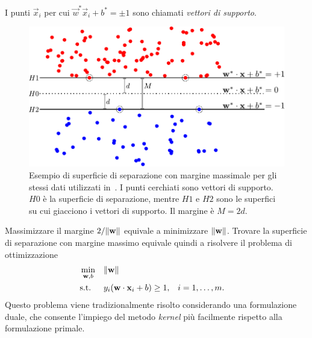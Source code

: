I punti $\Vec{x}_i$ per cui $\Vec{w}^*\Vec{x}_i + b^* = \pm 1$ sono chiamati \emph{vettori di supporto}.
\begin{figure}
    \centering
    \includegraphics[width=0.7\linewidth]{img/margine_separazione.pdf}
    \caption[Esempio \emph{maximal margin classifier}.]{Esempio di superficie di separazione con margine massimale per gli stessi dati utilizzati in~. I punti cerchiati sono vettori di supporto. $H0$ è la superficie di separazione, mentre $H1$ e $H2$ sono le superfici su cui giacciono i vettori di supporto. Il margine è $M=2d$.}
    \label{fig:optimal_separation_margin}
\end{figure}
%
Massimizzare il margine $2/\norm{\vec{w}}$ equivale a minimizzare $\norm{\Vec{w}}$. 
Trovare la superficie di separazione con margine massimo equivale quindi a risolvere il problema di ottimizzazione
\begin{equation}
\label{eq:svc:hardmargin:primal}
\begin{aligned}
& \min_{\Vec{w},b} && \norm{\Vec{w}} \\
& \textrm{s.t.} && y_i(\Vec{w}\cdot \Vec{x}_i + b) \geq 1, && i=1,\dots,m. \\
\end{aligned}
\end{equation}
Questo problema viene tradizionalmente risolto considerando una formulazione duale, che consente l'impiego del metodo \emph{kernel} più facilmente rispetto alla formulazione primale.

